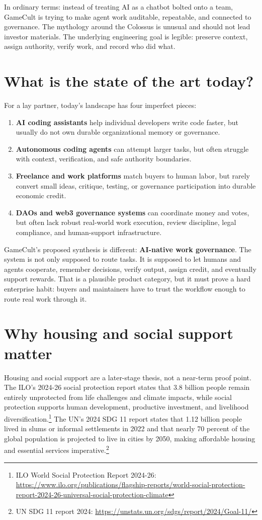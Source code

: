 \documentclass[11pt,oneside]{report}
\newcommand{\term}[1]{\textbf{#1}}
\newcommand{\src}[2]{\footnote{#1: \url{#2}}}
\begin{document}
In ordinary terms: instead of treating AI as a chatbot bolted onto a team, GameCult is trying to make agent work auditable, repeatable, and connected to governance. The mythology around the Colossus is unusual and should not lead investor materials. The underlying engineering goal is legible: preserve context, assign authority, verify work, and record who did what.

\section{What is the state of the art today?}

For a lay partner, today's landscape has four imperfect pieces:

\begin{enumerate}
  \item \term{AI coding assistants} help individual developers write code faster, but usually do not own durable organizational memory or governance.
  \item \term{Autonomous coding agents} can attempt larger tasks, but often struggle with context, verification, and safe authority boundaries.
  \item \term{Freelance and work platforms} match buyers to human labor, but rarely convert small ideas, critique, testing, or governance participation into durable economic credit.
  \item \term{DAOs and web3 governance systems} can coordinate money and votes, but often lack robust real-world work execution, review discipline, legal compliance, and human-support infrastructure.
\end{enumerate}

GameCult's proposed synthesis is different: \term{AI-native work governance}. The system is not only supposed to route tasks. It is supposed to let humans and agents cooperate, remember decisions, verify output, assign credit, and eventually support rewards. That is a plausible product category, but it must prove a hard enterprise habit: buyers and maintainers have to trust the workflow enough to route real work through it.

\section{Why housing and social support matter}

Housing and social support are a later-stage thesis, not a near-term proof point. The ILO's 2024-26 social protection report states that 3.8 billion people remain entirely unprotected from life challenges and climate impacts, while social protection supports human development, productive investment, and livelihood diversification.\src{ILO World Social Protection Report 2024-26}{https://www.ilo.org/publications/flagship-reports/world-social-protection-report-2024-26-universal-social-protection-climate} The UN's 2024 SDG 11 report states that 1.12 billion people lived in slums or informal settlements in 2022 and that nearly 70 percent of the global population is projected to live in cities by 2050, making affordable housing and essential services imperative.\src{UN SDG 11 report 2024}{https://unstats.un.org/sdgs/report/2024/Goal-11/}
\end{document}
